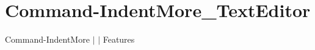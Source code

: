 \chapter{Command-\/\+Indent\+More\+\_\+\+Text\+Editor }
\hypertarget{md__docs_2_text_editor_2_features_2_command-_indent_more___text_editor}{}\label{md__docs_2_text_editor_2_features_2_command-_indent_more___text_editor}
Command-\/\+Indent\+More \texorpdfstring{$\vert$}{|}  \texorpdfstring{$\vert$}{|} Features



 